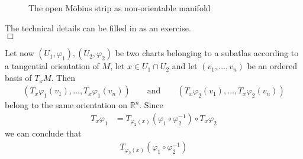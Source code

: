 \begin{exa}
\begin{enumerate}
\begin{figure}[h!]
\caption{The open M{\"o}bius strip as non-orientable manifold}
\label{fig:moebius}
\end{figure}
\end{enumerate}
\end{exa}
\begin{prf}
The technical details can be filled in as an exercise.
\\
\phantom{proven}
\hfill
$\Box$
\end{prf}
Let now $(U_{1},\varphi_{1}),(U_{2},\varphi_{2})$ be two charts belonging to a subatlas according to a tangential orientation of $M$, let $x \in U_{1} \cap U_{2}$ and let $(v_{1},\ldots,v_{n})$ be an ordered basis of $T_{x}M$. Then
\begin{align*}
  \left(
    T_{x}\varphi_{1}(v_{1})
    ,
    \ldots
    ,
    T_{x}\varphi_{1}(v_{n})
  \right)
  \qquad
  \text{and}
  \qquad
  \left(
    T_{x}\varphi_{2}(v_{1})
    ,
    \ldots
    ,
    T_{x}\varphi_{2}(v_{n})
  \right)
\end{align*}
belong to the same orientation on $\mathbb{R}^{n}$. Since
\begin{align*}
  T_{x}\varphi_{1}
  &=
  T_{\varphi_{2}(x)}(\varphi_{1} \circ \varphi_{2}^{-1})
  \circ
  T_{x}\varphi_{2}
\end{align*}
we can conclude that
\begin{align*}
  T_{\varphi_{2}(x)}
  \left(
    \varphi_{1}
    \circ
    \varphi_{2}^{-1}
  \right)
\end{align*}
